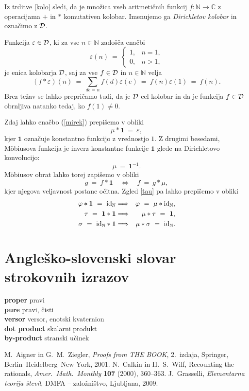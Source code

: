 \documentclass[a4paper,12pt]{article}
\def\N{\mathbb{N}} %
\def\C{\mathbb{C}} %
\newcommand{\geslo}[2]{\noindent\textbf{#1} \quad \hangindent=1cm #2\\[-1pc]}
\begin{document}
Iz trditve \ref{kolo} sledi, da je množica vseh aritmetičnih funkcij $f: \N \to \C$ z operacijama $+$ in $*$ komutativen kolobar. Imenujemo ga {\em Dirichletov kolobar} in označimo z $\cal D$. 

Funkcija $\varepsilon \in {\cal D}$, ki za vse $n \in \N$ zadošča enačbi
\[
\varepsilon(n)\ =\ \left\{
\begin{array}{ll}
1, & n = 1, \\
0, & n > 1,
\end{array}
\right.
\]
je enica kolobarja $\cal D$, saj za vse $f \in {\cal D}$ in $n \in \N$ velja
\[
(f * \varepsilon)(n) \ =\ \sum_{d e = n} f(d)\varepsilon(e) \ =\ f(n)\varepsilon(1) \ =\ f(n).
\]
Brez težav se lahko prepričamo tudi, da je $\cal D$ cel kolobar in da je funkcija $f \in {\cal D}$
obrnljiva natanko tedaj, ko $f(1) \ne 0$.

Zdaj lahko enačbo (\ref{mirek}) prepišemo v obliki
\[
\mu * \mathbf{1}\ = \ \varepsilon,
\]
kjer $\mathbf{1}$ označuje konstantno funkcijo z vrednostjo $1$. Z drugimi besedami, M\"obiusova funkcija
je inverz konstantne funkcije $\mathbf{1}$ glede na Dirichletovo konvolucijo:
\[
\mu \ =\  \mathbf{1}^{-1}.
\]
M\"obiusov obrat lahko torej zapišemo v obliki
\[
g\ =\ f * \mathbf{1} \quad \Longleftrightarrow \quad f\ =\ g * \mu,
\]
kjer njegova veljavnost postane očitna. Zgled \ref{tau} pa lahko prepišemo v obliki
\begin{eqnarray*}
\varphi * \mathbf{1} \ =\ {\rm id}_\N &\Longrightarrow& \varphi\ =\ \mu * {\rm id}_\N, \\
\tau \ =\ \mathbf{1} * \mathbf{1} &\Longrightarrow& \mu * \tau \ =\ \mathbf{1}, \\
\sigma \ =\ {\rm id}_\N * \mathbf{1} &\Longrightarrow& \mu * \sigma \ =\ {\rm id}_\N.
\end{eqnarray*}


\section*{Angleško-slovenski slovar strokovnih izrazov}

\geslo{proper}{pravi}

\geslo{pure}{pravi, čisti}

\geslo{versor}{versor, enotski kvaternion}

\geslo{dot product}{skalarni produkt}

\geslo{by-product}{stranski učinek}




\begin{thebibliography}{1}
M.~Aigner in G.~M.~Ziegler, \emph{Proofs from THE BOOK}, 2.\ izdaja, Springer, Berlin--Heidelberg--New York, 2001.
N.~Calkin in H.~S.~Wilf, Recounting the rationals,
\emph{Amer.~Math.~Monthly}  \textbf{107}  (2000),  360--363.
J.~Grasselli, \emph{Elementarna teorija števil}, DMFA -- založništvo, Ljubljana, 2009.
\end{thebibliography}
\end{document}
